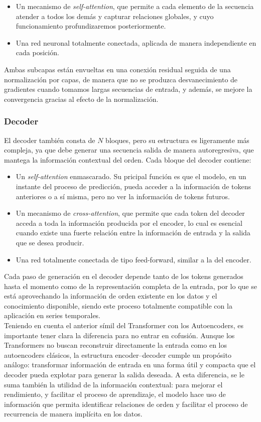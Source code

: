 \begin{itemize}
	\item Un mecanismo de \textit{self-attention}, que permite a cada elemento de la secuencia atender a todos los demás y capturar relaciones globales, y cuyo funcionamiento profundizaremos posteriormente.
	\item Una red neuronal totalmente conectada, aplicada de manera independiente en cada posición.
\end{itemize}

Ambas subcapas están envueltas en una conexión residual seguida de una normalización por capas, de manera que no se produzca desvanecimiento de gradientes cuando tomamos largas secuencias de entrada, y además, se mejore la convergencia gracias al efecto de la normalización.

\subsubsection{Decoder}  
El decoder también consta de $N$ bloques, pero su estructura es ligeramente más compleja, ya que debe generar una secuencia salida de manera autoregresiva, que mantega la información contextual del orden. Cada bloque del decoder contiene:

\begin{itemize}
	\item Un \textit{self-attention} enmascarado. Su pricipal función es que el modelo, en un instante del proceso de predicción, pueda acceder a la información de tokens anteriores o a sí misma, pero no ver la información de tokens futuros.
	\item Un mecanismo de \textit{cross-attention}, que permite que cada token del decoder acceda a toda la información producida por el encoder, lo cual es esencial cuando existe una fuerte relación entre la información de entrada y la salida que se desea producir.
	\item Una red totalmente conectada de tipo feed-forward, similar a la del encoder.
\end{itemize}

Cada paso de generación en el decoder depende tanto de los tokens generados hasta el momento como de la representación completa de la entrada, por lo que se está aprovechando la información de orden existente en los datos y el conocimiento disponible, siendo este proceso totalmente compatible con la aplicación en series temporales.\\

Teniendo en cuenta el anterior símil del Transformer con los Autoencoders, es importante tener clara la diferencia para no entrar en cofusión. Aunque los Transformers no buscan reconstruir directamente la entrada como en los autoencoders clásicos, la estructura encoder–decoder cumple un propósito análogo: transformar información de entrada en una forma útil y compacta que el decoder pueda explotar para generar la salida deseada. A esta diferencia, se le suma también la utilidad de la información contextual: para mejorar el rendimiento, y facilitar el proceso de aprendizaje, el modelo hace uso de información que permita identificar relaciones de orden y facilitar el proceso de recurrencia de manera implícita en los datos.

